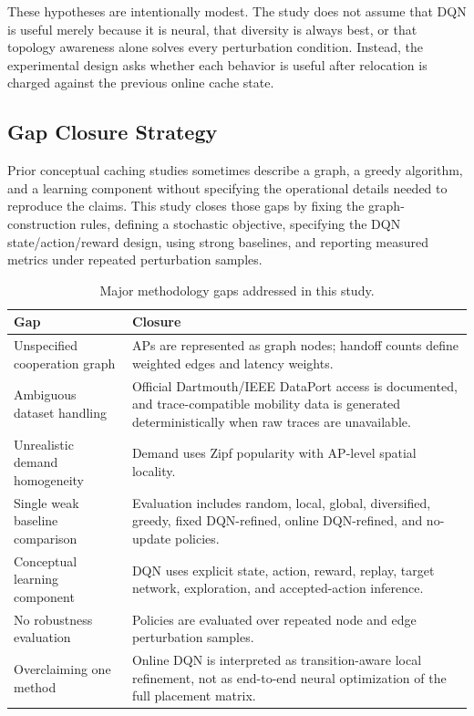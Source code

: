 These hypotheses are intentionally modest. The study does not assume that DQN is useful merely because it is neural, that diversity is always best, or that topology awareness alone solves every perturbation condition. Instead, the experimental design asks whether each behavior is useful after relocation is charged against the previous online cache state.

\subsection{Gap Closure Strategy}

Prior conceptual caching studies sometimes describe a graph, a greedy algorithm, and a learning component without specifying the operational details needed to reproduce the claims. This study closes those gaps by fixing the graph-construction rules, defining a stochastic objective, specifying the DQN state/action/reward design, using strong baselines, and reporting measured metrics under repeated perturbation samples.

\begin{table}[t]
\centering
\caption{Major methodology gaps addressed in this study.}
\label{tab:gap_closure}
\begin{tabular}{p{}p{}}
\toprule
Gap & Closure \\
\midrule
Unspecified cooperation graph & APs are represented as graph nodes; handoff counts define weighted edges and latency weights. \\
Ambiguous dataset handling & Official Dartmouth/IEEE DataPort access is documented, and trace-compatible mobility data is generated deterministically when raw traces are unavailable. \\
Unrealistic demand homogeneity & Demand uses Zipf popularity with AP-level spatial locality. \\
Single weak baseline comparison & Evaluation includes random, local, global, diversified, greedy, fixed DQN-refined, online DQN-refined, and no-update policies. \\
Conceptual learning component & DQN uses explicit state, action, reward, replay, target network, exploration, and accepted-action inference. \\
No robustness evaluation & Policies are evaluated over repeated node and edge perturbation samples. \\
Overclaiming one method & Online DQN is interpreted as transition-aware local refinement, not as end-to-end neural optimization of the full placement matrix. \\
\bottomrule
\end{tabular}
\end{table}

